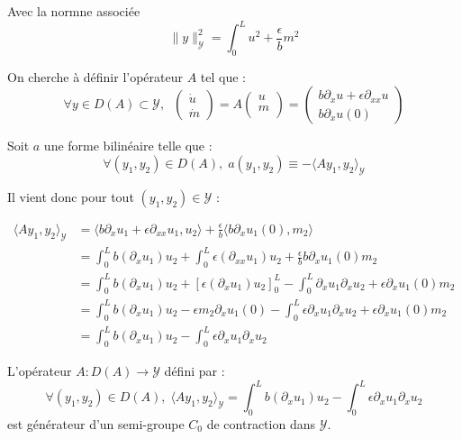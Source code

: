 \documentclass[a4paper]{article}
\newcommand{\dep}{b}
\begin{document}
 Avec la normne associée 
 \[\| y\|_{\mathscr{Y}}^2 = \int_0^L u^2 + \displaystyle \frac{\epsilon}{\dep} m^2 \]


On cherche à définir l'opérateur $A$ tel que :
\[ \forall y \in D(A) \subset \mathscr{Y}, \; \; 
\left( \begin{array}{c}
\dot{u}\\
\dot{m}
\end{array} \right)
= A \left( \begin{array}{c}
u\\
m\\
\end{array} \right) 
= \left(\begin{array}{c}
\dep \partial_x u + \epsilon \partial_{xx} u\\
\dep \partial_x u(0)
\end{array}\right) \]

Soit $a$ une forme bilinéaire telle que :
\[ \forall (y_1,y_2) \in D(A), \; a(y_1,y_2) \equiv - \langle A y_1,y_2\rangle_{\mathscr{Y}} \]

Il vient donc pour tout $(y_1,y_2) \in \mathscr{Y}$ :

\[
\begin{split}
	\langle A y_1,y_2\rangle_{\mathscr{Y}} & = 
	                  \langle \dep \partial_x u_1 + \epsilon \partial_{xx}u_1 ,u_2\rangle
					  + \displaystyle \frac{\epsilon}{\dep} \langle \dep \partial_x u_1(0),m_2\rangle \\	
                        &= \int_0^L \dep (\partial_xu_1)u_2
                           + \int_0^L \epsilon (\partial_{xx} u_1)u_2
                           + \displaystyle \frac{\epsilon}{\dep} \dep \partial_xu_1(0)m_2\\
						& =   \int_0^L \dep (\partial_xu_1)u_2
						   + [\epsilon (\partial_x u_1)u_2]_0^L 
						  - \int_0^L \partial_xu_1 \partial_xu_2
						   + \epsilon \partial_xu_1(0)m_2\\
						& = \int_0^L \dep (\partial_xu_1)u_2
						  -\epsilon m_2 \partial_x u_1(0) 
						 - \int_0^L \epsilon \partial_xu_1 \partial_xu_2
						   + \epsilon \partial_xu_1(0)m_2\\
   						& = \int_0^L \dep (\partial_xu_1)u_2 
   						 - \int_0^L \epsilon \partial_xu_1 \partial_xu_2
\end{split}
\]

 
\begin{proposition}
	\label{prop:cas2}
	L'opérateur $A: D(A) \to \mathscr{Y}$ défini par :
	\begin{equation} 
		\label{def:A2}
	\forall (y_1,y_2) \in D(A), \; 
	\langle A y_1,y_2\rangle_{\mathscr{Y}} =\int_0^L \dep (\partial_xu_1)u_2
                           -  \int_0^L \epsilon \partial_xu_1 \partial_xu_2
	\end{equation}
	est générateur d'un semi-groupe $C_0$ de contraction dans $\mathscr{Y}$.
\end{proposition}						
\end{document}
